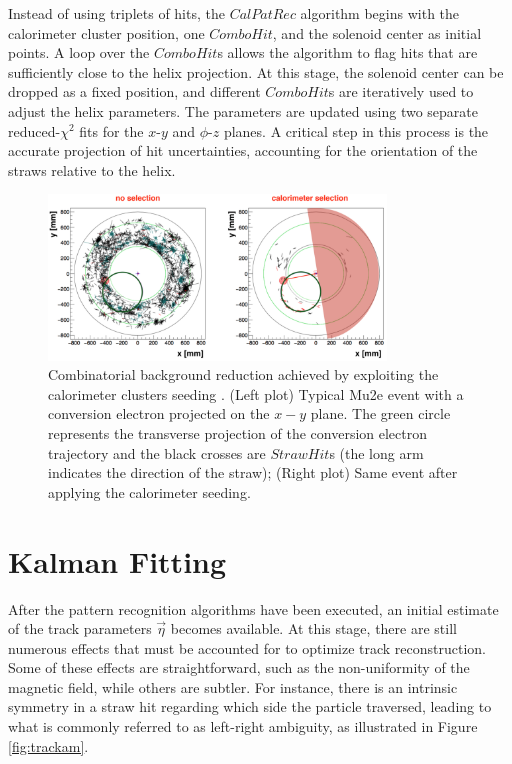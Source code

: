 Instead of using triplets of hits, the $CalPatRec$ algorithm begins with 
the calorimeter cluster position, one $ComboHit$, and the solenoid 
center as initial points. A loop over the $ComboHit$s allows the 
algorithm to flag hits that are sufficiently close to the helix projection. 
At this stage, the solenoid center can be dropped as a fixed position, and 
different $ComboHit$s are iteratively used to adjust the helix parameters. 
The parameters are updated using two separate reduced-$\chi^2$ fits for the 
$x$-$y$ and $\phi$-$z$ planes. A critical step in this process is the 
accurate projection of hit uncertainties, accounting for the orientation 
of the straws relative to the helix.


\begin{figure}[!h]
    \centering
    \includegraphics[width =0.8\textwidth]{figures/png/Screenshot_20240810_165014.png}
    \caption[Combinatorial background reduction achieved by exploiting the calorimeter 
    clusters seeding.]{Combinatorial background reduction achieved by exploiting the 
    calorimeter clusters seeding \cite{trkpat}. (Left plot) Typical Mu2e event 
    with a conversion electron
    projected on the $x-y$ plane. The green circle represents 
    the transverse projection of the
    conversion electron trajectory and the black crosses are $StrawHit$s (the long arm 
    indicates the direction of the straw); (Right plot) Same event 
    after applying the calorimeter seeding.}
    \label{fig:combinatorial}
\end{figure}


\section{Kalman Fitting}
After the pattern recognition algorithms have been executed, 
an initial estimate of the track parameters $\vec{\eta}$ becomes 
available. At this stage, there are still numerous effects that 
must be accounted for to optimize track reconstruction. Some of 
these effects are straightforward, such as the non-uniformity of 
the magnetic field, while others are subtler. For instance, there 
is an intrinsic symmetry in a straw hit regarding which side the 
particle traversed, leading to what is commonly referred to as left-right 
ambiguity, as illustrated in Figure \ref{fig:trackam}.

